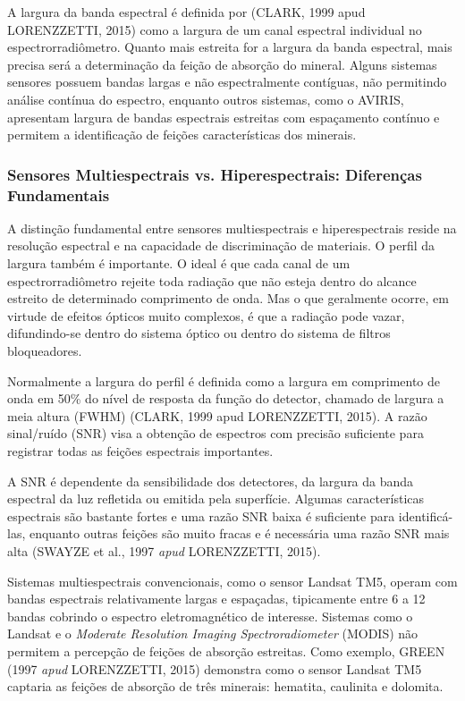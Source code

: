 A largura da banda espectral é definida por (CLARK, 1999 apud LORENZZETTI, 
2015) como a largura de um canal espectral individual no 
espectrorradiômetro. Quanto mais estreita for a largura da banda espectral, 
mais precisa será a determinação da feição de absorção do mineral. Alguns sistemas sensores possuem bandas largas e não espectralmente
contíguas, não permitindo análise contínua do espectro, enquanto outros
sistemas, como o AVIRIS, apresentam largura de bandas espectrais estreitas
com espaçamento contínuo e permitem a identificação de feições
características dos minerais.

\subsubsection{Sensores Multiespectrais vs. Hiperespectrais: Diferenças 
Fundamentais}

A distinção fundamental entre sensores multiespectrais e hiperespectrais 
reside na resolução espectral e na capacidade de discriminação de materiais. 
O perfil da largura também é importante. O ideal é que cada canal de um 
espectrorradiômetro rejeite toda radiação que não esteja dentro do alcance 
estreito de determinado comprimento de onda. Mas o que geralmente ocorre, 
em virtude de efeitos ópticos muito complexos, é que a radiação pode vazar, 
difundindo-se dentro do sistema óptico ou dentro do sistema de filtros 
bloqueadores.

Normalmente a largura do perfil é definida como a largura em comprimento 
de onda em 50\% do nível de resposta da função do detector, chamado de 
largura a meia altura (FWHM) (CLARK, 1999 apud LORENZZETTI, 2015). A razão 
sinal/ruído (SNR) visa a obtenção de espectros com precisão suficiente para 
registrar todas as feições espectrais importantes.

A SNR é dependente da sensibilidade dos detectores, da largura da banda 
espectral da luz refletida ou emitida pela superfície. Algumas características espectrais são bastante fortes e uma razão
SNR baixa é suficiente para identificá-las, enquanto outras
feições são muito fracas e é necessária uma razão SNR mais alta (SWAYZE
et al., 1997 \textit{apud} LORENZZETTI, 2015).

Sistemas multiespectrais convencionais, como o sensor Landsat TM5, operam
com bandas espectrais relativamente largas e espaçadas, tipicamente entre
6 a 12 bandas cobrindo o espectro eletromagnético de interesse. Sistemas
como o Landsat e o \textit{Moderate Resolution Imaging Spectroradiometer}
(MODIS) não permitem a percepção de feições de absorção estreitas. Como exemplo, GREEN (1997 \textit{apud} LORENZZETTI, 2015) demonstra
como o sensor Landsat TM5 captaria as feições de absorção de três minerais:
hematita, caulinita e dolomita.

